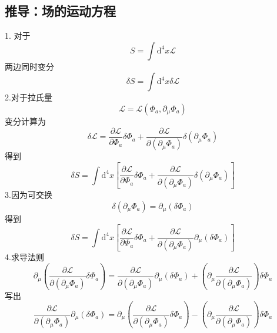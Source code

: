 \subsection{推导：场的运动方程}
1.
对于
\begin{equation}
    S=\int{\mathrm{d}^4x}\mathcal{L} 
\end{equation}
两边同时变分
\begin{equation}
    \delta S=\int{\mathrm{d}^4x}\delta \mathcal{L} 
\end{equation}
2.对于拉氏量
\begin{equation}
    \mathcal{L} =\mathcal{L} (\Phi _a,\partial _{\mu}\Phi _a)
\end{equation}
变分计算为
\begin{equation}
    \delta \mathcal{L} =\frac{\partial \mathcal{L}}{\partial \Phi _a}\delta \Phi _a+\frac{\partial \mathcal{L}}{\partial \left( \partial _{\mu}\Phi _a \right)}\delta \left( \partial _{\mu}\Phi _a \right) 
\end{equation}
得到
\begin{equation}
    \delta S=\int{\mathrm{d}^4x\left[ \frac{\partial \mathcal{L}}{\partial \Phi _a}\delta \Phi _a+\frac{\partial \mathcal{L}}{\partial \left( \partial _{\mu}\Phi _a \right)}\delta \left( \partial _{\mu}\Phi _a \right) \right]}
\end{equation}
3.因为可交换
\begin{equation}
    \delta \left( \partial _{\mu}\Phi _a \right) =\partial _{\mu}\left( \delta \Phi _a \right) 
\end{equation}
得到
\begin{equation}
    \delta S=\int{\mathrm{d}^4x}\left[ \frac{\partial \mathcal{L}}{\partial \Phi _a}\delta \Phi _a+\frac{\partial \mathcal{L}}{\partial \left( \partial _{\mu}\Phi _a \right)}\partial _{\mu}\left( \delta \Phi _a \right) \right] 
\end{equation}
4.求导法则
\begin{equation}
    \partial _{\mu}\left( \frac{\partial \mathcal{L}}{\partial \left( \partial _{\mu}\Phi _a \right)}\delta \Phi _a \right) =\frac{\partial \mathcal{L}}{\partial \left( \partial _{\mu}\Phi _a \right)}\partial _{\mu}\left( \delta \Phi _a \right) +\left( \partial _{\mu}\frac{\partial \mathcal{L}}{\partial \left( \partial _{\mu}\Phi _a \right)} \right) \delta \Phi _a
\end{equation}
写出
\begin{equation}
    \frac{\partial \mathcal{L}}{\partial \left( \partial _{\mu}\Phi _a \right)}\partial _{\mu}\left( \delta \Phi _a \right) =\partial _{\mu}\left( \frac{\partial \mathcal{L}}{\partial \left( \partial _{\mu}\Phi _a \right)}\delta \Phi _a \right) -\left( \partial _{\mu}\frac{\partial \mathcal{L}}{\partial \left( \partial _{\mu}\Phi _a \right)} \right) \delta \Phi _a
\end{equation}
